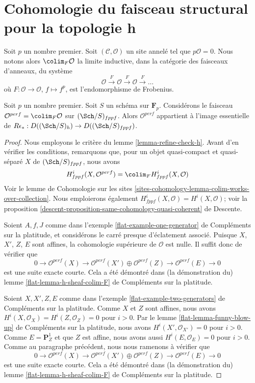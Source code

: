 \section{Cohomologie du faisceau structural pour la topologie h}
\label{section-cohomology-O-h}

\noindent
Soit $p$ un nombre premier. Soit $(\mathcal{C}, \mathcal{O})$ un site annelé
tel que $p\mathcal{O} = 0$. Nous notons alors $\colim_F \mathcal{O}$
la limite inductive, dans la catégorie des faisceaux d'anneaux, du système
$$
\mathcal{O} \xrightarrow{F} \mathcal{O} \xrightarrow{F}
\mathcal{O} \xrightarrow{F} \ldots
$$
où $F : \mathcal{O} \to \mathcal{O}$, $f \mapsto f^p$,
est l'endomorphisme de Frobenius.

\begin{lemma}
\label{lemma-h-sheaf-colim-F}
Soit $p$ un nombre premier. Soit $S$ un schéma sur $\mathbf{F}_p$.
Considérons le faisceau $\mathcal{O}^{perf} = \colim_F \mathcal{O}$
sur $(\Sch/S)_{fppf}$. Alors $\mathcal{O}^{perf}$ appartient à l'image
essentielle de $R\epsilon_* : D((\Sch/S)_h) \to D((\Sch/S)_{fppf})$.
\end{lemma}

\begin{proof}
Nous employons le critère du lemme \ref{lemma-refine-check-h}.
Avant d'en vérifier les conditions, remarquons que, pour un objet
quasi-compact et quasi-séparé $X$ de
$(\Sch/S)_{fppf}$, nous avons
$$
H^i_{fppf}(X, \mathcal{O}^{perf}) = \colim_F H^i_{fppf}(X, \mathcal{O})
$$
Voir le lemme de Cohomologie sur les sites
\ref{sites-cohomology-lemma-colim-works-over-collection}.
Nous emploierons également $H^i_{fppf}(X, \mathcal{O}) = H^i(X, \mathcal{O})$; voir la
proposition \ref{descent-proposition-same-cohomology-quasi-coherent} de Descente.

\medskip\noindent
Soient $A, f, J$ comme dans
l'exemple \ref{flat-example-one-generator} de Compléments sur la platitude,
et considérons le carré presque d'éclatement associé.
Puisque $X$, $X'$, $Z$, $E$ sont affines, la cohomologie
supérieure de $\mathcal{O}$ est nulle. Il suffit donc
de vérifier que
$$
0 \to
\mathcal{O}^{perf}(X) \to
\mathcal{O}^{perf}(X') \oplus \mathcal{O}^{perf}(Z) \to
\mathcal{O}^{perf}(E) \to 0
$$
est une suite exacte courte. Cela a été démontré dans (la démonstration du)
lemme \ref{flat-lemma-h-sheaf-colim-F} de Compléments sur la platitude.

\medskip\noindent
Soient $X, X', Z, E$ comme dans
l'exemple \ref{flat-example-two-generators} de Compléments sur la platitude.
Comme $X$ et $Z$ sont affines, nous avons
$H^i(X, \mathcal{O}_X) = H^i(Z, \mathcal{O}_Z) = 0$ pour $i > 0$.
Par le lemme \ref{flat-lemma-funny-blow-up} de Compléments sur la platitude,
nous avons $H^i(X', \mathcal{O}_{X'}) = 0$ pour $i > 0$.
Comme $E = \mathbf{P}^1_Z$ et que $Z$ est affine, nous avons aussi
$H^i(E, \mathcal{O}_E) = 0$ pour $i > 0$. Comme au paragraphe
précédent, nous nous ramenons à vérifier que
$$
0 \to
\mathcal{O}^{perf}(X) \to
\mathcal{O}^{perf}(X') \oplus \mathcal{O}^{perf}(Z) \to
\mathcal{O}^{perf}(E) \to 0
$$
est une suite exacte courte. Cela a été démontré dans (la démonstration du)
lemme \ref{flat-lemma-h-sheaf-colim-F} de Compléments sur la platitude.
\end{proof}

